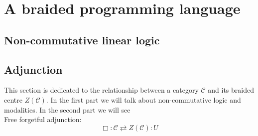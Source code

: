 \documentclass{article}
\begin{document}
\section{A braided programming language}


\subsection{Non-commutative linear logic}



\subsection{Adjunction}
This section is dedicated to the relationship between a category $\mathcal{C}$ and its braided centre $Z(\mathcal{C})$. In the first part we will talk about non-commutative logic and modalities. In the second part we will see \\

Free forgetful adjunction:
$$\Box: \mathcal{C} \rightleftarrows Z(\mathcal{C}):U$$ \\
\end{document}
